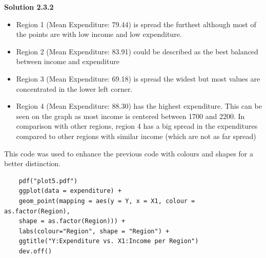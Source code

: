 \documentclass[12pt,letterpaper]{article}
\begin{document}
\textbf{Solution 2.3.2}
\begin{itemize}
	\item Region 1 (Mean Expenditure: 79.44) is spread the furthest although most of the points are with low income and low expenditure.
	\item Region 2 (Mean Expenditure: 83.91) could be described as the best balanced between income and expenditure
	\item Region 3 (Mean Expenditure: 69.18) is spread the widest but most values are concentrated in the lower left corner.
	\item Region 4 (Mean Expenditure: 88.30) has the highest expenditure. This can be seen on the graph as most income is centered between 1700 and 2200. In comparison with other regions, region 4 has a big spread in the expenditures compared to other regions with similar income (which are not as far spread)
\end{itemize}

This code was used to enhance the previous code with colours and shapes for a better distinction.
\begin{verbatim}
	pdf("plot5.pdf")
	ggplot(data = expenditure) +    
	geom_point(mapping = aes(y = Y, x = X1, colour = as.factor(Region), 
	shape = as.factor(Region))) + 
	labs(colour="Region", shape = "Region") +  
	ggtitle("Y:Expenditure vs. X1:Income per Region")
	dev.off()
\end{verbatim}
\end{document}
